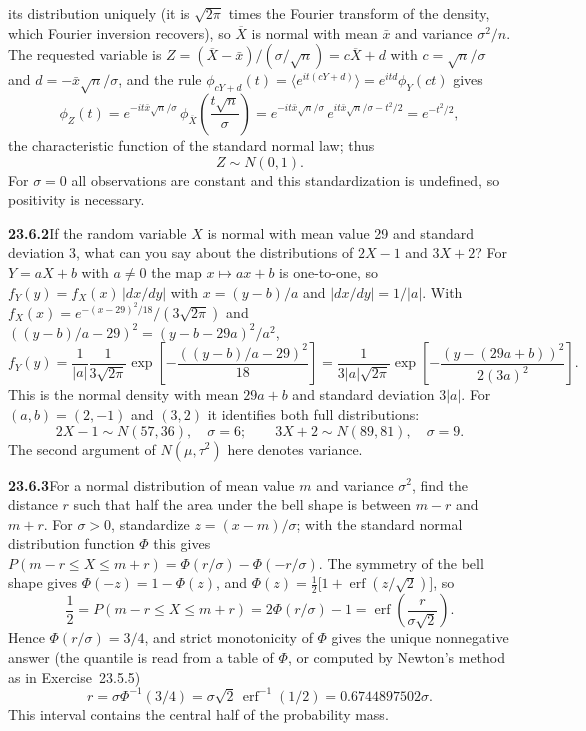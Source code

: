 its distribution uniquely (it is $\sqrt{2\pi}$ times the Fourier transform
of the density, which Fourier inversion recovers), so
$\overline X$ is normal with mean $\bar x$
and variance $\sigma^2/n$. The requested variable is
$Z=(\overline X-\bar x)/(\sigma/\sqrt n)=c\overline X+d$ with
$c=\sqrt n/\sigma$ and $d=-\bar x\sqrt n/\sigma$, and the rule
$\phi_{cY+d}(t)=\langle e^{it(cY+d)}\rangle=e^{itd}\phi_Y(ct)$ gives
\[
\phi_Z(t)=e^{-it\bar x\sqrt n/\sigma}\,
\phi_{\overline X}\!\left(\frac{t\sqrt n}\sigma\right)
=e^{-it\bar x\sqrt n/\sigma}\,e^{it\bar x\sqrt n/\sigma-t^2/2}
=e^{-t^2/2},
\]
the characteristic function of the standard normal law; thus
\[
\boxed{Z\sim N(0,1)}.
\]
For $\sigma=0$ all observations are constant and this standardization
is undefined, so positivity is necessary.


\par\bigskip
\noindent\textbf{23.6.2}\quad If the random variable $X$ is
normal with mean value 29 and standard deviation 3, what can you
say about the distributions of $2X-1$ and $3X+2$?
\solution
For $Y=aX+b$ with $a\ne0$ the map $x\mapsto ax+b$ is one-to-one, so
$f_Y(y)=f_X(x)\,|dx/dy|$ with $x=(y-b)/a$ and $|dx/dy|=1/|a|$.
With $f_X(x)=e^{-(x-29)^2/18}/(3\sqrt{2\pi})$ and
$((y-b)/a-29)^2=(y-b-29a)^2/a^2$,
\[
f_Y(y)=\frac1{|a|}\frac1{3\sqrt{2\pi}}
\exp\left[-\frac{((y-b)/a-29)^2}{18}\right]
=\frac1{3|a|\sqrt{2\pi}}
\exp\left[-\frac{(y-(29a+b))^2}{2(3a)^2}\right].
\]
This is the normal density with mean $29a+b$ and standard deviation
$3|a|$. For $(a,b)=(2,-1)$ and $(3,2)$ it identifies both full
distributions:
\[
\boxed{2X-1\sim N(57,36),\quad\sigma=6;\qquad
3X+2\sim N(89,81),\quad\sigma=9}.
\]
The second argument of $N(\mu,\tau^2)$ here denotes variance.


\par\bigskip
\noindent\textbf{23.6.3}\quad For a normal distribution of mean
value $m$ and variance $\sigma^{2}$, find the distance $r$ such
that half the area under the bell shape is between $m-r$ and
$m+r$. 
\solution
For $\sigma>0$, standardize $z=(x-m)/\sigma$; with the standard normal
distribution function $\Phi$ this gives
$P(m-r\le X\le m+r)=\Phi(r/\sigma)-\Phi(-r/\sigma)$. The symmetry of the
bell shape gives $\Phi(-z)=1-\Phi(z)$, and
$\Phi(z)=\frac12\bigl[1+\operatorname{erf}(z/\sqrt2)\bigr]$, so
\[
\frac12=P(m-r\le X\le m+r)
=2\Phi(r/\sigma)-1
=\operatorname{erf}\left(\frac r{\sigma\sqrt2}\right).
\]
Hence $\Phi(r/\sigma)=3/4$, and strict monotonicity of $\Phi$ gives the
unique nonnegative answer (the quantile is read from a table of $\Phi$, or
computed by Newton's method as in Exercise~23.5.5)
\[
\boxed{r=\sigma\Phi^{-1}(3/4)
=\sigma\sqrt2\,\operatorname{erf}^{-1}(1/2)
=0.6744897502\sigma}.
\]
This interval contains the central half of the probability mass.


